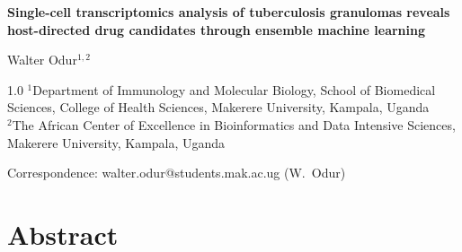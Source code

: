 \documentclass[12pt]{article}
\begin{document}
\begin{center}
{\Large\bfseries Single-cell transcriptomics analysis of tuberculosis granulomas reveals host-directed drug candidates through ensemble machine learning}
\end{center}

\vspace{6pt}

\noindent Walter Odur$^{1,2}$

\vspace{2pt}

{\small\itshape\begin{spacing}{1.0}%
\noindent $^{1}$Department of Immunology and Molecular Biology, School of Biomedical Sciences, College of Health Sciences, Makerere University, Kampala, Uganda\\[1pt]
\noindent $^{2}$The African Center of Excellence in Bioinformatics and Data Intensive Sciences, Makerere University, Kampala, Uganda%
\end{spacing}}

\vspace{2pt}

{\small\noindent Correspondence: walter.odur@students.mak.ac.ug (W.~Odur)}

\section*{Abstract}
\end{document}
